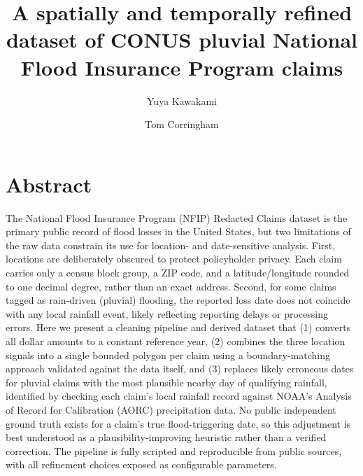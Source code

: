 \newcommand{\fix}[1]{%
    \colorbox{red!20}{\textbf{Fix} --- #1}%
}
\newcommand{\note}[1]{%
    \colorbox{blue!20}{\textbf{Note} --- #1}%
}

\title{A spatially and temporally refined dataset of CONUS pluvial National Flood
Insurance Program claims}

\author[1]{Yuya Kawakami}
\author[2]{Tom Corringham}




\date{}



\maketitle

\section*{Abstract}

The National Flood Insurance Program (NFIP) Redacted Claims dataset is
the primary public record of flood losses in the United States, but
two limitations of the raw data constrain its use for location- and
date-sensitive analysis. First, locations are deliberately obscured to
protect policyholder privacy. Each claim carries only a census block
group, a ZIP code, and a latitude/longitude rounded to one decimal
degree, rather than an exact address. Second, for some claims tagged as
rain-driven (pluvial) flooding, the reported loss date does not
coincide with any local rainfall event, likely reflecting reporting
delays or processing errors. Here we present a cleaning pipeline and
derived dataset that (1) converts all dollar amounts to a constant
reference year, (2) combines the three location signals into a single
bounded polygon per claim using a boundary-matching approach validated
against the data itself, and (3) replaces likely erroneous dates for
pluvial claims with the most plausible nearby day of qualifying
rainfall, identified by checking each claim's local rainfall record
against NOAA's Analysis of Record for Calibration (AORC) precipitation
data. No public independent ground truth exists for a claim's true
flood-triggering date, so this adjustment is best understood as a
plausibility-improving heuristic rather than a verified correction.
The pipeline is fully scripted and reproducible from public sources,
with all refinement choices exposed as configurable parameters.

